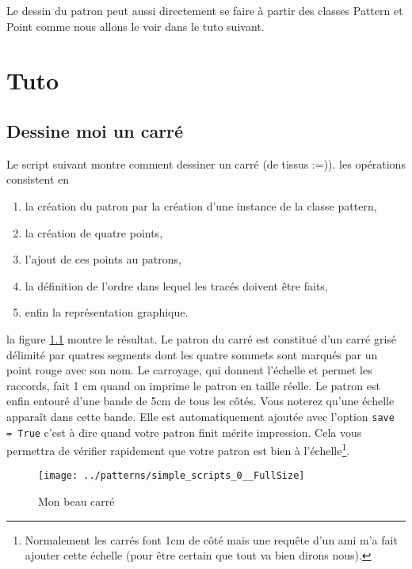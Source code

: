 \documentclass[11pt,a4paper]{report}
\begin{document}
Le dessin du patron peut aussi  directement se faire à partir des classes Pattern et Point comme nous allons le voir dans le tuto suivant.

\chapter{Tuto}


\section{Dessine moi un carré}

Le script suivant montre comment dessiner un carré (de tissus :=)).
les opérations consistent en
\begin{enumerate}
  \item la création du patron par la création d'une instance de la classe pattern,
  \item la création de quatre points,
  \item l'ajout de ces points au patrons,
  \item la définition de l'ordre dans lequel les tracés doivent être faits,
  \item enfin la représentation graphique.
\end{enumerate}



la figure \ref{fig:carre} montre le résultat. Le patron du carré est constitué d'un carré grisé délimité par quatres segments dont les quatre sommets sont marqués par un point rouge avec son nom.  Le carroyage, qui donnent l'échelle et permet les raccords, fait 1 cm quand on imprime le patron en taille réelle. Le patron est enfin entouré d'une bande de 5cm de tous les côtés. Vous noterez qu'une échelle apparaît dans cette bande. Elle est automatiquement ajoutée avec l'option \texttt{save = True} c'est à dire quand votre patron finit mérite impression. Cela vous permettra de vérifier rapidement que votre patron est bien à l'échelle\footnote{Normalement les carrés font 1cm de côté mais une requête d'un ami m'a fait ajouter cette échelle (pour être certain que tout va bien dirons nous).}.

\begin{figure}
\begin{center}
\texttt{[image: ../patterns/simple\_scripts\_0\_\_FullSize]}
\end{center}
\caption{Mon beau carré}
\label{fig:carre}
\end{figure}
\end{document}

